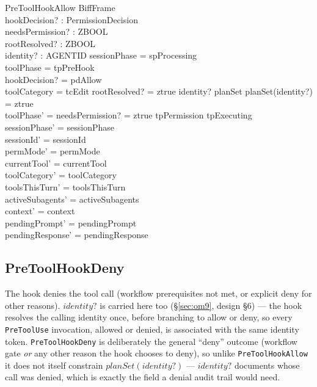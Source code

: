 \documentclass[a4paper,10pt,fleqn]{article}
\begin{document}
\begin{schema}{PreToolHookAllow}
  BiffFrame \\
  hookDecision? : PermissionDecision \\
  needsPermission? : ZBOOL \\
  rootResolved? : ZBOOL \\
  identity? : AGENTID
  \where
  sessionPhase = spProcessing \\
  toolPhase = tpPreHook \\
  hookDecision? = pdAllow \\
  toolCategory = tcEdit \land rootResolved? = ztrue \implies
    identity? \in \dom planSet \land planSet(identity?) = ztrue \\
  toolPhase' = \IF needsPermission? = ztrue \THEN tpPermission \ELSE tpExecuting \\
  sessionPhase' = sessionPhase \\
  sessionId' = sessionId \\
  permMode' = permMode \\
  currentTool' = currentTool \\
  toolCategory' = toolCategory \\
  toolsThisTurn' = toolsThisTurn \\
  activeSubagents' = activeSubagents \\
  context' = context \\
  pendingPrompt' = pendingPrompt \\
  pendingResponse' = pendingResponse
\end{schema}

\subsection{PreToolHookDeny}

The hook denies the tool call (workflow prerequisites not met,
or explicit deny for other reasons). $identity?$ is carried here too
(\S\ref{sec:om9}, design \S6) --- the hook resolves the calling identity
once, before branching to allow or deny, so every \texttt{PreToolUse}
invocation, allowed or denied, is associated with the same identity
token.  \texttt{PreToolHookDeny} is deliberately the general ``deny''
outcome (workflow gate \emph{or} any other reason the hook chooses to
deny), so unlike \texttt{PreToolHookAllow} it does not itself constrain
$planSet(identity?)$ --- $identity?$ documents whose call was denied,
which is exactly the field a denial audit trail would need.
\end{document}
